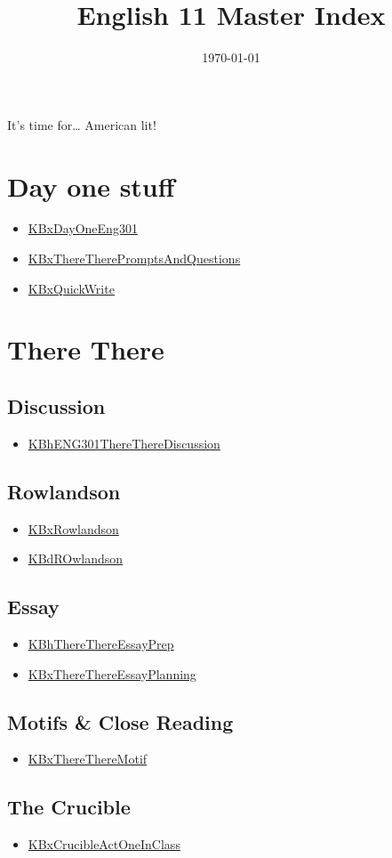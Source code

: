 \documentclass[letterpaper]{article}
\date{\today}
\title{English 11 Master Index}
\renewcommand\maketitle{}
\begin{document}
\maketitle
It's time for\ldots{} American lit!

\section{Day one stuff}
\label{sec:orgb862d48}
\begin{itemize}
\item \href{KBxDayOneEng301.org}{KBxDayOneEng301}
\item \href{KBxThereTherePromptsAndQuestions.org}{KBxThereTherePromptsAndQuestions}
\item \href{KBxQuickWrite.org}{KBxQuickWrite}
\end{itemize}

\section{There There}
\label{sec:org0e62b44}
\subsection{Discussion}
\label{sec:org335dbfe}
\begin{itemize}
\item \href{KBhENG301ThereThereDiscussion.org}{KBhENG301ThereThereDiscussion}
\end{itemize}

\subsection{Rowlandson}
\label{sec:org0553e75}
\begin{itemize}
\item \href{KBxRowlandson.org}{KBxRowlandson}
\item \href{KBdROwlandson.org}{KBdROwlandson}
\end{itemize}

\subsection{Essay}
\label{sec:org578bdf9}
\begin{itemize}
\item \href{KBhThereThereEssayPrep.org}{KBhThereThereEssayPrep}
\item \href{KBxThereThereEssayPlanning.org}{KBxThereThereEssayPlanning}
\end{itemize}

\subsection{Motifs \& Close Reading}
\label{sec:org8972f3d}
\begin{itemize}
\item \href{KBxThereThereMotif.org}{KBxThereThereMotif}
\end{itemize}

\subsection{The Crucible}
\label{sec:org4f63c27}
\begin{itemize}
\item \href{KBxCrucibleActOneInClass.org}{KBxCrucibleActOneInClass}
\end{itemize}
\end{document}

